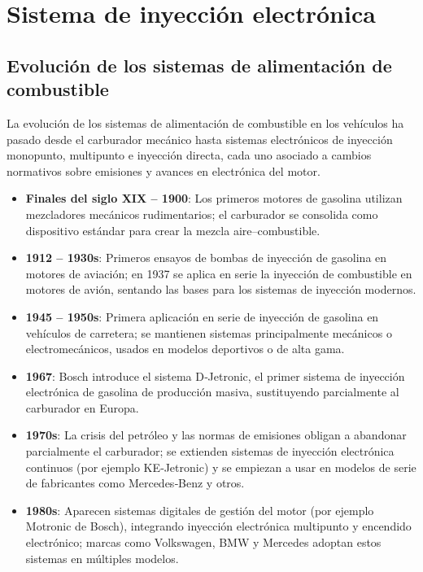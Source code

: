 \section{Sistema de inyección electrónica}
\subsection{Evolución de los sistemas de alimentación de combustible}


La evolución de los sistemas de alimentación de combustible en los vehículos ha pasado desde el carburador mecánico hasta sistemas electrónicos de inyección monopunto, multipunto e inyección directa, cada uno asociado a cambios normativos sobre emisiones y avances en electrónica del motor\citep{web1,web10,web14}.

\begin{itemize}
    \item \textbf{Finales del siglo XIX -- 1900}:  
    Los primeros motores de gasolina utilizan mezcladores mecánicos rudimentarios; el carburador se consolida como dispositivo estándar para crear la mezcla aire–combustible\citep{web10, web14}.

    \item \textbf{1912 -- 1930s}:  
    Primeros ensayos de bombas de inyección de gasolina en motores de aviación; en 1937 se aplica en serie la inyección de combustible en motores de avión, sentando las bases para los sistemas de inyección modernos\citep{web14}.

    \item \textbf{1945 -- 1950s}:  
    Primera aplicación en serie de inyección de gasolina en vehículos de carretera; se mantienen sistemas principalmente mecánicos o electromecánicos, usados en modelos deportivos o de alta gama\citep{web14}.

    \item \textbf{1967}:  
    Bosch introduce el sistema D‑Jetronic, el primer sistema de inyección electrónica de gasolina de producción masiva, sustituyendo parcialmente al carburador en Europa\citep{web1}.

    \item \textbf{1970s}:  
    La crisis del petróleo y las normas de emisiones obligan a abandonar parcialmente el carburador; se extienden sistemas de inyección electrónica continuos (por ejemplo KE‑Jetronic) y se empiezan a usar en modelos de serie de fabricantes como Mercedes‑Benz y otros\citep{web1,web14}.

    \item \textbf{1980s}:  
    Aparecen sistemas digitales de gestión del motor (por ejemplo Motronic de Bosch), integrando inyección electrónica multipunto y encendido electrónico; marcas como Volkswagen, BMW y Mercedes adoptan estos sistemas en múltiples modelos\citep{web7}.


\end{itemize}
